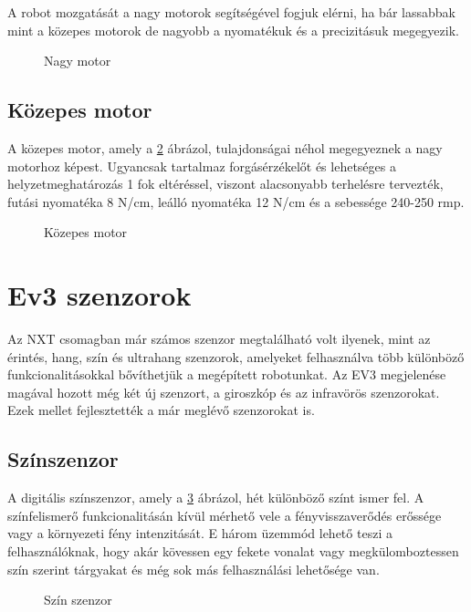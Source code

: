 A robot mozgatását a nagy motorok segítségével fogjuk elérni, ha bár lassabbak mint a közepes motorok de nagyobb a nyomatékuk és a precizitásuk megegyezik.

\begin{figure}[!htb]
	\label{fig:lMotor}
	\centering
	\caption{Nagy motor}
\end{figure}

\subsection{Közepes motor}
A közepes motor, amely a \ref{fig:mMotor} ábrázol, tulajdonságai néhol megegyeznek a nagy motorhoz képest. Ugyancsak tartalmaz forgásérzékelőt és lehetséges a helyzetmeghatározás 1 fok eltéréssel, viszont alacsonyabb terhelésre tervezték, futási nyomatéka 8 N/cm, leálló nyomatéka 12 N/cm és a sebessége 240-250 rmp.

\begin{figure}[!htb]
	\label{fig:mMotor}
	\centering
	\caption{Közepes motor}
\end{figure}

\section{Ev3 szenzorok}\label{sec:ROBOT:szenzorok}

Az NXT csomagban már számos szenzor megtalálható volt ilyenek, mint az érintés, hang, szín és ultrahang szenzorok, amelyeket felhasználva több különböző funkcionalitásokkal bővíthetjük a megépített robotunkat. Az EV3 megjelenése magával hozott még két új szenzort, a giroszkóp és az infravörös szenzorokat. Ezek mellet fejlesztették a már meglévő szenzorokat is.

\subsection{Színszenzor}

A digitális színszenzor, amely a \ref{fig:colorSensor} ábrázol, hét különböző színt ismer fel. A színfelismerő funkcionalitásán kívül mérhető vele a fényvisszaverődés erőssége vagy a környezeti fény intenzitását. E három üzemmód lehető teszi a felhasználóknak, hogy akár kövessen egy fekete vonalat vagy megkülomboztessen szín szerint tárgyakat és még sok más felhasználási lehetősége van.

\begin{figure}[!htb]
	\label{fig:colorSensor}
	\centering
	\caption{Szín szenzor}
\end{figure}

